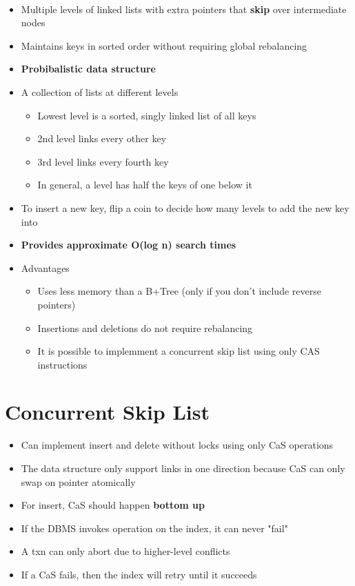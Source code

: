 \documentclass[11pt]{article}
\begin{document}
~\cite{p668-pugh}
\begin{itemize}
    \item Multiple levels of linked lists with extra pointers that \textbf{skip} over intermediate nodes
    \item Maintains keys in sorted order without requiring global rebalancing
    \item \textbf{Probibalistic data structure}
    \item A collection of lists at different levels
    \begin{itemize}
        \item Lowest level is a sorted, singly linked list of all keys
        \item 2nd level links every other key
        \item 3rd level links every fourth key
        \item In general, a level has half the keys of one below it
    \end{itemize}
    \item To insert a new key, flip a coin to decide how many levels to add the new key into
    \item \textbf{Provides approximate O(log n) search times}
    \item Advantages
    \begin{itemize}
        \item Uses less memory than a B+Tree (only if you don't include reverse pointers)
        \item Insertions and deletions do not require rebalancing
        \item It is possible to implemment a concurrent skip list using only CAS instructions
    \end{itemize}
\end{itemize}

\section{Concurrent Skip List~\cite{hpugh-concurrent-tr1990}}
\begin{itemize}
    \item Can implement insert and delete without locks using only CaS operations
    \item The data structure only support links in one direction because CaS can only swap on pointer atomically
    \item For insert, CaS should happen \textbf{bottom up}
    \item If the DBMS invokes operation on the index, it can never "fail"
    \item A txn can only abort due to higher-level conflicts
    \item If a CaS fails, then the index will retry until it succeeds
\end{itemize}
\end{document}
